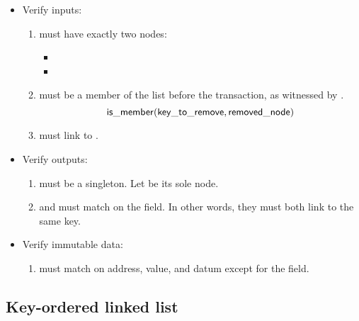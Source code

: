 \documentclass[../midgard.tex]{subfiles}
\begin{document}
\begin{description}
\begin{itemize}
            \item Verify inputs:
            \begin{enumerate}[resume]
                \item {} must have exactly two nodes:
                    \begin{itemize}
                        \item {}
                        \item {}
                    \end{itemize}
                \item {} must be a member of the list before the transaction, as witnessed by .
                    \begin{equation*}
                        \mathsf{is\_member} (\mathsf{key\_to\_remove}, \mathsf{removed\_node})
                    \end{equation*}
                \item {} must link to .
            \end{enumerate}

            \item Verify outputs:
            \begin{enumerate}[resume]
                \item {} must be a singleton.
                  Let  be its sole node.
                \item {} and  must match on the  field.
                  In other words, they must both link to the same key.
            \end{enumerate}
            
            \item Verify immutable data:
            \begin{enumerate}[resume]
                \item {} must match  on address, value, and datum except for the  field.
            \end{enumerate}
        \end{itemize}
\end{description}

\subsection{Key-ordered linked list}
\label{h:key-ordered-list}
\end{document}
